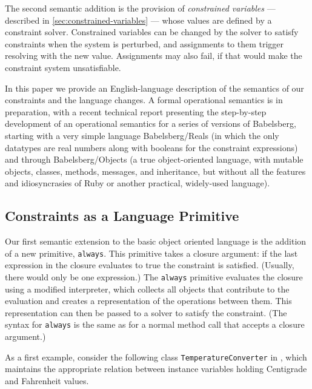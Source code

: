 The second semantic addition is the provision of
\emph{constrained variables} ---
described in \autoref{sec:constrained-variables} --- whose values are
defined by a constraint solver. Constrained variables can be changed
by the solver to satisfy constraints when the system is perturbed, and
assignments to them trigger resolving with the new value. Assignments
may also fail, if that would make the constraint system unsatisfiable.

In this paper we provide an English-language description of the
semantics of our constraints and the language changes.  A formal
operational semantics is in preparation, with a recent
technical report \cite{felgentreff-babelsberg-formal-semantics-tr-2014}  
presenting the step-by-step development of an
operational semantics for a series of versions of
Babelsberg, starting with a very simple language Babelsberg/Reals (in
which the only datatypes are real numbers along with booleans for the
constraint expressions) and through
Babelsberg/Objects (a true object-oriented language, with mutable
objects, classes, methods, messages, and inheritance, but without all the
features and idiosyncrasies of Ruby or another practical, 
widely-used language).

\subsection{Constraints as a Language Primitive}
\label{sec:constr-constr-always}
Our first semantic extension to the basic object oriented language is
the addition of a new primitive, \lstinline{always}. This primitive
takes a closure argument: if the last expression in the closure
evaluates to true the constraint is satisfied.  (Usually, there would
only be one expression.) The \lstinline{always} primitive evaluates
the closure using a modified interpreter, which collects
all objects that contribute to the evaluation and creates a
representation of the operations between them. This representation can
then be passed to a solver to satisfy the constraint. (The syntax for
\lstinline{always} is the same as for a normal method call that
accepts a closure argument.)


As a first example, consider the following class
\lstinline{TemperatureConverter} in \linebreak \toolname, which maintains the
appropriate relation between instance variables holding Centigrade and
Fahrenheit values.

